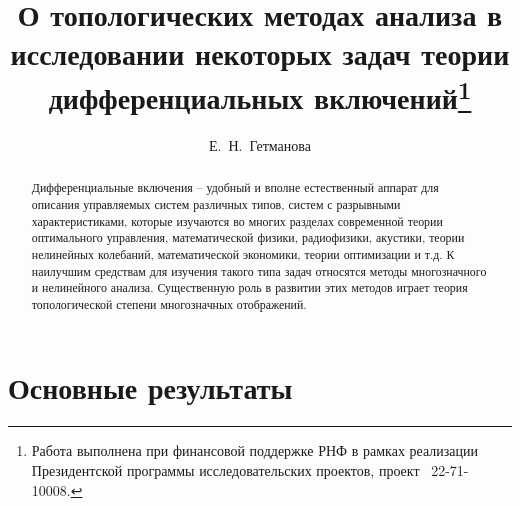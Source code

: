 \usepackage{todonotes}

\usepackage[russian]{nla}


\fi

\title{О топологических методах анализа в исследовании некоторых задач теории дифференциальных включений\thanks{Работа выполнена при финансовой поддержке РНФ в рамках реализации Президентской программы исследовательских проектов, проект \textnumero~22-71-10008.}}
\author{Е.~Н.~Гетманова 
}


\maketitle

\begin{abstract}
Дифференциальные включения -- удобный и вполне естественный аппарат для описания управляемых систем различных типов, систем с разрывными характеристиками, которые изучаются во многих разделах современной теории оптимального управления, математической физики, радиофизики, акустики, теории нелинейных колебаний, математической экономики, теории оптимизации и т.д. К наилучшим средствам для изучения такого типа задач относятся методы многозначного и нелинейного анализа. Существенную роль в развитии этих методов играет теория топологической степени многозначных отображений.


\end{abstract}

\section{Основные результаты} %


